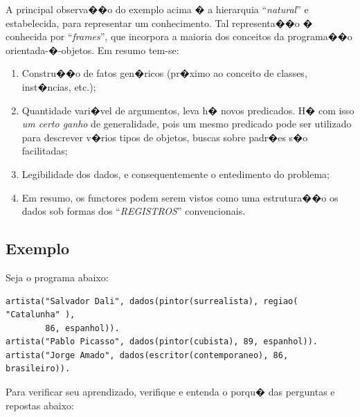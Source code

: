\documentclass[final,a4paper]{article}
\begin{document}
 A principal observa��o do exemplo acima �
a hierarquia ``{\em natural}'' e estabelecida, para
representar um conhecimento. Tal representa��o
� conhecida por ``{\em frames}'', que incorpora
a maioria dos conceitos da programa��o
orientada-�-objetos. Em resumo tem-se:

\begin{enumerate}
\item Constru��o de fatos gen�ricos (pr�ximo ao
        conceito de classes, inst�ncias, etc.);

\item Quantidade vari�vel de argumentos,
        leva h� novos predicados. H� com isso
{\em um certo ganho} de  generalidade, pois um
mesmo predicado pode ser utilizado para descrever v�rios
tipos de objetos, buscas sobre padr�es s�o facilitadas;

\item Legibilidade dos dados,  e consequentemente
o entedimento do problema;

\item Em resumo, os functores podem serem vistos como
uma estrutura��o os dados sob formas dos
       ``{\em {\mbox REGISTROS}}'' convencionais.
\end{enumerate}

\subsection{Exemplo}
Seja o programa abaixo:
{\small
\begin{verbatim}
artista("Salvador Dali", dados(pintor(surrealista), regiao( "Catalunha" ), 
        86, espanhol)).
artista("Pablo Picasso", dados(pintor(cubista), 89, espanhol)).
artista("Jorge Amado", dados(escritor(contemporaneo), 86, brasileiro)).
\end{verbatim}
}

\noindent Para verificar seu aprendizado, verifique e
entenda o porqu� das perguntas e repostas abaixo:
\end{document}
